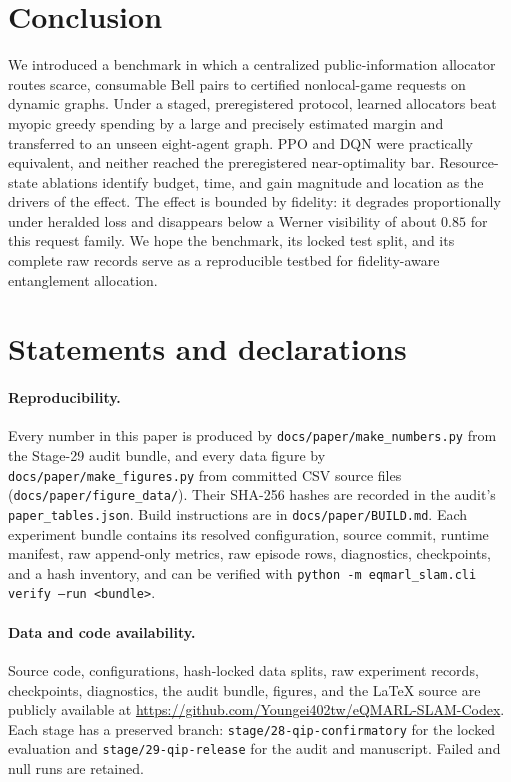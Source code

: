 \documentclass[11pt,a4paper]{article}
\begin{document}
\section{Conclusion}\label{sec:conclusion}

We introduced a benchmark in which a centralized public-information allocator routes scarce, consumable Bell pairs to certified nonlocal-game requests on dynamic graphs. Under a staged, preregistered protocol, learned allocators beat myopic greedy spending by a large and precisely estimated margin and transferred to an unseen eight-agent graph. PPO and DQN were practically equivalent, and neither reached the preregistered near-optimality bar. Resource-state ablations identify budget, time, and gain magnitude and location as the drivers of the effect. The effect is bounded by fidelity: it degrades proportionally under heralded loss and disappears below a Werner visibility of about $0.85$ for this request family. We hope the benchmark, its locked test split, and its complete raw records serve as a reproducible testbed for fidelity-aware entanglement allocation.

\section*{Statements and declarations}

\paragraph{Reproducibility.} Every number in this paper is produced by \texttt{docs/paper/make\_numbers.py} from the Stage-29 audit bundle, and every data figure by \texttt{docs/paper/make\_figures.py} from committed CSV source files (\texttt{docs/paper/figure\_data/}). Their SHA-256 hashes are recorded in the audit's \texttt{paper\_tables.json}. Build instructions are in \texttt{docs/paper/BUILD.md}. Each experiment bundle contains its resolved configuration, source commit, runtime manifest, raw append-only metrics, raw episode rows, diagnostics, checkpoints, and a hash inventory, and can be verified with \texttt{python -m eqmarl\_slam.cli verify --run <bundle>}.

\paragraph{Data and code availability.} Source code, configurations, hash-locked data splits, raw experiment records, checkpoints, diagnostics, the audit bundle, figures, and the \LaTeX{} source are publicly available at \url{https://github.com/Youngei402tw/eQMARL-SLAM-Codex}. Each stage has a preserved branch: \texttt{stage/28-qip-confirmatory} for the locked evaluation and \texttt{stage/29-qip-release} for the audit and manuscript. Failed and null runs are retained.
\end{document}

